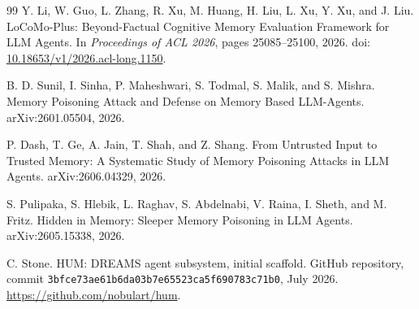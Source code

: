 \documentclass[11pt,a4paper]{article}
\begin{document}
\begin{thebibliography}{99}
Y. Li, W. Guo, L. Zhang, R. Xu, M. Huang, H. Liu, L. Xu, Y. Xu, and J. Liu.
\newblock LoCoMo-Plus: Beyond-Factual Cognitive Memory Evaluation Framework for LLM Agents.
\newblock In \emph{Proceedings of ACL 2026}, pages 25085--25100, 2026.
\newblock doi: \href{https://doi.org/10.18653/v1/2026.acl-long.1150}{10.18653/v1/2026.acl-long.1150}.

B. D. Sunil, I. Sinha, P. Maheshwari, S. Todmal, S. Malik, and S. Mishra.
\newblock Memory Poisoning Attack and Defense on Memory Based LLM-Agents.
\newblock arXiv:2601.05504, 2026.

P. Dash, T. Ge, A. Jain, T. Shah, and Z. Shang.
\newblock From Untrusted Input to Trusted Memory: A Systematic Study of Memory Poisoning Attacks in LLM Agents.
\newblock arXiv:2606.04329, 2026.

S. Pulipaka, S. Hlebik, L. Raghav, S. Abdelnabi, V. Raina, I. Sheth, and M. Fritz.
\newblock Hidden in Memory: Sleeper Memory Poisoning in LLM Agents.
\newblock arXiv:2605.15338, 2026.

C. Stone.
\newblock HUM: DREAMS agent subsystem, initial scaffold.
\newblock GitHub repository, commit \texttt{3bfce73ae61b6da03b7e65523ca5f690783c71b0}, July 2026.
\newblock \url{https://github.com/nobulart/hum}.

\end{thebibliography}
\end{document}

